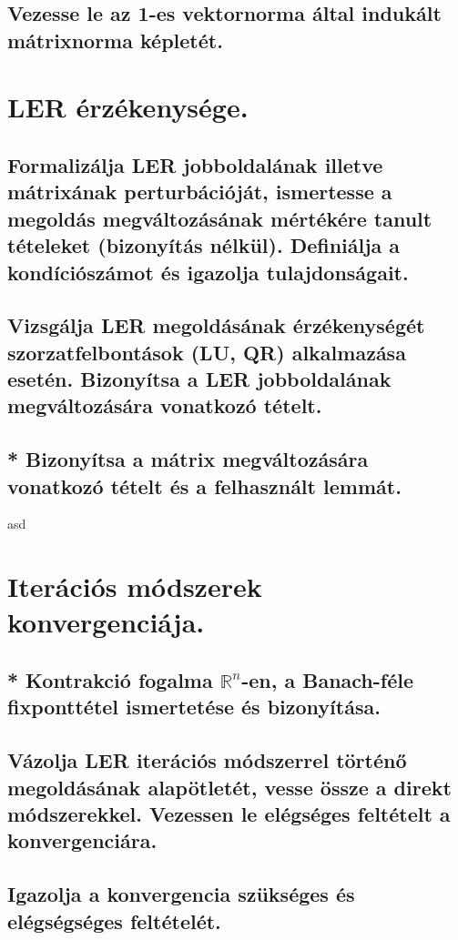 \documentclass{article}
\begin{document}
        \subsection{Vezesse le az 1-es vektornorma által indukált mátrixnorma képletét.}

    
    \section{LER érzékenysége.}
        \subsection{Formalizálja LER jobboldalának illetve mátrixának perturbációját, ismertesse a megoldás megváltozásának mértékére tanult tételeket (bizonyítás nélkül). Definiálja a kondíciószámot és igazolja tulajdonságait.}
        \subsection{Vizsgálja LER megoldásának érzékenységét szorzatfelbontások (LU, QR) alkalmazása esetén. Bizonyítsa a LER jobboldalának megváltozására vonatkozó tételt.}
        \subsection{* Bizonyítsa a mátrix megváltozására vonatkozó tételt és a felhasznált lemmát.}

asd
    \section{Iterációs módszerek konvergenciája.}
        \subsection{* Kontrakció fogalma $\mathbb{R}^n$-en, a Banach-féle fixponttétel ismertetése és bizonyítása.}
        \subsection{Vázolja LER iterációs módszerrel történő megoldásának alapötletét, vesse össze a direkt módszerekkel. Vezessen le elégséges feltételt a konvergenciára.}
        \subsection{Igazolja a konvergencia szükséges és elégségséges feltételét.}
\end{document}

